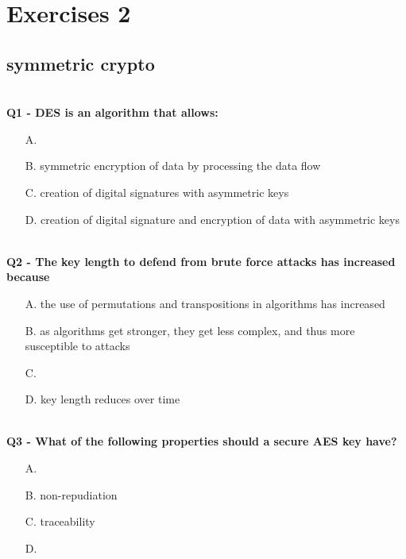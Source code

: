\chapter{Exercises 2}

\section{symmetric crypto}

\textbf{\\Q1 - DES is an algorithm that allows:}
\begin{enumerate}
	\item[A.] 
	\item[B.] symmetric encryption of data by processing the data flow
	\item[C.] creation of digital signatures with asymmetric keys
	\item[D.] creation of digital signature and encryption of data with asymmetric keys
\end{enumerate}

\textbf{\\Q2 - The key length to defend from brute force attacks has increased because}
\begin{enumerate}
	\item[A.] the use of permutations and transpositions in algorithms has increased
	\item[B.] as algorithms get stronger, they get less complex, and thus more susceptible to attacks
	\item[C.] 
	\item[D.] key length reduces over time
\end{enumerate}

\textbf{\\Q3 - What of the following properties should a secure AES key have?}
\begin{enumerate}
	\item[A.] 
	\item[B.] non-repudiation
	\item[C.] traceability
	\item[D.] 
\end{enumerate}

